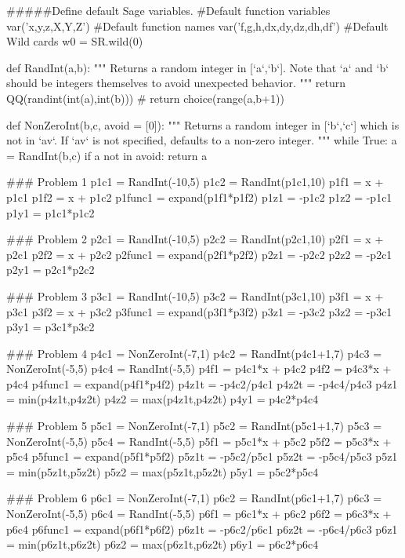 \documentclass{ximera}
\begin{document}
\begin{sagesilent}
#####Define default Sage variables.
#Default function variables
var('x,y,z,X,Y,Z')
#Default function names
var('f,g,h,dx,dy,dz,dh,df')
#Default Wild cards
w0 = SR.wild(0)

def RandInt(a,b):
    """ Returns a random integer in [`a`,`b`]. Note that `a` and `b` should be integers themselves to avoid unexpected behavior.
    """
    return QQ(randint(int(a),int(b)))
    # return choice(range(a,b+1))

def NonZeroInt(b,c, avoid = [0]):
    """ Returns a random integer in [`b`,`c`] which is not in `av`. 
        If `av` is not specified, defaults to a non-zero integer.
    """
    while True:
        a = RandInt(b,c)
        if a not in avoid:
            return a

\end{sagesilent}
\begin{sagesilent}
### Problem 1
p1c1 = RandInt(-10,5)
p1c2 = RandInt(p1c1,10)
p1f1 = x + p1c1
p1f2 = x + p1c2
p1func1 = expand(p1f1*p1f2)
p1z1 = -p1c2
p1z2 = -p1c1
p1y1 = p1c1*p1c2


### Problem 2
p2c1 = RandInt(-10,5)
p2c2 = RandInt(p2c1,10)
p2f1 = x + p2c1
p2f2 = x + p2c2
p2func1 = expand(p2f1*p2f2)
p2z1 = -p2c2
p2z2 = -p2c1
p2y1 = p2c1*p2c2


### Problem 3
p3c1 = RandInt(-10,5)
p3c2 = RandInt(p3c1,10)
p3f1 = x + p3c1
p3f2 = x + p3c2
p3func1 = expand(p3f1*p3f2)
p3z1 = -p3c2
p3z2 = -p3c1
p3y1 = p3c1*p3c2


### Problem 4
p4c1 = NonZeroInt(-7,1)
p4c2 = RandInt(p4c1+1,7)
p4c3 = NonZeroInt(-5,5)
p4c4 = RandInt(-5,5)
p4f1 = p4c1*x + p4c2
p4f2 = p4c3*x + p4c4
p4func1 = expand(p4f1*p4f2)
p4z1t = -p4c2/p4c1
p4z2t = -p4c4/p4c3
p4z1 = min(p4z1t,p4z2t)
p4z2 = max(p4z1t,p4z2t)
p4y1 = p4c2*p4c4


### Problem 5
p5c1 = NonZeroInt(-7,1)
p5c2 = RandInt(p5c1+1,7)
p5c3 = NonZeroInt(-5,5)
p5c4 = RandInt(-5,5)
p5f1 = p5c1*x + p5c2
p5f2 = p5c3*x + p5c4
p5func1 = expand(p5f1*p5f2)
p5z1t = -p5c2/p5c1
p5z2t = -p5c4/p5c3
p5z1 = min(p5z1t,p5z2t)
p5z2 = max(p5z1t,p5z2t)
p5y1 = p5c2*p5c4


### Problem 6
p6c1 = NonZeroInt(-7,1)
p6c2 = RandInt(p6c1+1,7)
p6c3 = NonZeroInt(-5,5)
p6c4 = RandInt(-5,5)
p6f1 = p6c1*x + p6c2
p6f2 = p6c3*x + p6c4
p6func1 = expand(p6f1*p6f2)
p6z1t = -p6c2/p6c1
p6z2t = -p6c4/p6c3
p6z1 = min(p6z1t,p6z2t)
p6z2 = max(p6z1t,p6z2t)
p6y1 = p6c2*p6c4



\end{sagesilent}
\end{document}
